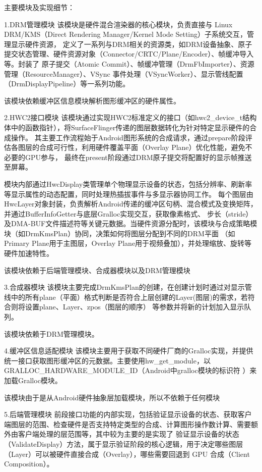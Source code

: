 主要模块及实现细节：

1.DRM管理模块
该模块是硬件混合渲染器的核心模块，负责直接与 Linux DRM/KMS（Direct Rendering Manager/Kernel Mode Setting）子系统交互，管理显示硬件资源，
定义了一系列与DRM相关的资源类，如DRM设备抽象、原子提交状态管理、硬件资源对象（Connector/CRTC/Plane/Encoder）、帧缓冲导入等。封装了
原子提交（Atomic Commit）、帧缓冲管理（DrmFbImporter）、资源管理（ResourceManager）、VSync 事件处理（VSyncWorker）、显示管线配置（DrmDisplayPipeline）等一系列功能。

该模块依赖缓冲区信息模块解析图形缓冲区的硬件属性。

2.HWC2接口模块
该模块通过实现HWC2标准定义的接口（如hwc2\_device\_t结构体中的函数指针），将SurfaceFlinger传递的图层数据转化为针对特定显示硬件的合成操作。
其主要工作流程始于Android图形系统的合成请求，通过prepare阶段评估各图层的合成可行性，利用硬件覆盖平面（Overlay Plane）优化性能，避免不必要的GPU参与，
最终在present阶段通过DRM原子提交将配置好的显示帧推送至屏幕。

模块内部通过HwcDisplay类管理单个物理显示设备的状态，包括分辨率、刷新率等显示属性的动态配置，同时处理热插拔事件与多显示器协同工作。
每个图层由HwcLayer对象封装，负责解析Android传递的缓冲区句柄、混合模式及变换矩阵，并通过BufferInfoGetter与底层Gralloc实现交互，获取像素格式、
步长（stride）及DMA-BUF文件描述符等关键元数据。当硬件资源分配时，该模块与合成策略模块（如DrmKmsPlan）协同，决策如何将图层分配到不同的DRM平面
（如Primary Plane用于主图层，Overlay Plane用于视频叠加），并处理缩放、旋转等硬件加速特性。

该模块依赖于后端管理模块、合成器模块以及DRM管理模块

3.合成器模块
该模块主要完成DrmKmsPlan的创建，在创建计划时通过对显示管线中的所有plane（平面）格式判断是否符合上层创建的Layer(图层)的需求，若符合则将设置plane、Layer、zpos（图层的顺序）
等参数并将新的计划加入显示队列。

该模块依赖于DRM管理模块。

4.缓冲区信息适配模块
该模块主要用于获取不同硬件厂商的Gralloc实现，并提供统一接口获取图形缓冲区的元数据。主要使用hw\_get\_module，以GRALLOC\_HARDWARE\_MODULE\_ID（Android中gralloc模块的标识符
）来加载Gralloc模块。

该模块由于是从Android硬件抽象层加载模块，所以不依赖于任何模块

5.后端管理模块
前段接口功能的内部实现，包括验证显示设备的状态、获取客户端图层的范围、检查硬件是否支持特定类型的合成、计算图形操作数计算、需要额外由客户端处理的层范围等，其中较为主要的是实现了
验证显示设备的状态（ValidateDisplay）方法，属于显示验证阶段的核心逻辑，用于决定哪些图层（Layer）可以被硬件直接合成（Overlay），哪些需要回退到 GPU 合成（Client Composition）。

